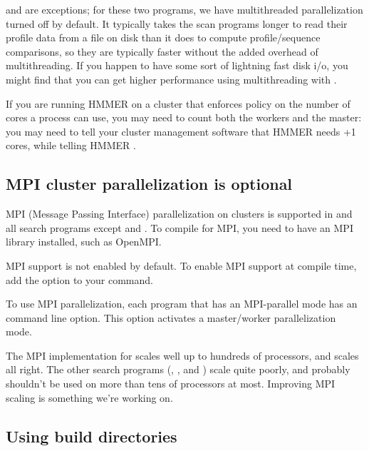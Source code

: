  and  are exceptions; for these two
programs, we have multithreaded parallelization turned off by
default. It typically takes the scan programs longer to read their
profile data from a file on disk than it does to compute
profile/sequence comparisons, so they are typically faster without the
added overhead of multithreading.  If you happen to have some sort of
lightning fast disk i/o, you might find that you can get higher
performance using multithreading with .

If you are running HMMER on a cluster that enforces policy on the
number of cores a process can use, you may need to count both the
workers and the master: you may need to tell your cluster management
software that HMMER needs +1 cores, while telling HMMER
.


\subsection{MPI cluster parallelization is optional}

MPI (Message Passing Interface) parallelization on clusters is
supported in  and all search programs except  and
. To compile for MPI, you need to have an MPI library
installed, such as OpenMPI.

MPI support is not enabled by default.  To enable MPI support at
compile time, add the  option to your
 command.

To use MPI parallelization, each program that has an MPI-parallel mode
has an  command line option. This option activates a
master/worker parallelization mode.

The MPI implementation for  scales well up to hundreds
of processors, and  scales all right. The other search
programs (, , and ) scale
quite poorly, and probably shouldn't be used on more than tens of
processors at most. Improving MPI scaling is something we're working on.


\subsection{Using build directories}

